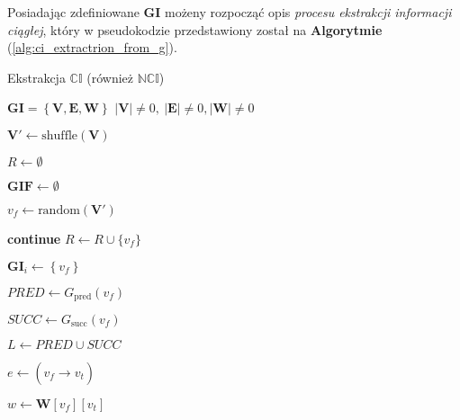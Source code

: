 Posiadając zdefiniowane $\mathbf{GI}$ możeny rozpocząć opis 
\textit{procesu ekstrakcji informacji ciągłej}, 
który w pseudokodzie przedstawiony został na \textbf{Algorytmie} (\ref{alg:ci_extractrion_from_g}).
\begin{algorithm}
    \caption{Ekstrakcja $\mathbb{CI}$ (również $\mathbb{NCI}$)}
    \label{alg:ci_extractrion_from_g}
    \begin{algorithmic}
        \Require $\mathbf{GI} = \left\{ \mathbf{V}, \mathbf{E}, \mathbf{W} \right\}$
        \Ensure $|\mathbf{V}| \neq 0, \: |\mathbf{E}| \neq 0, |\mathbf{W}| \neq 0$
        
        \State $\mathbf{V}' \gets \text{shuffle}(\mathbf{V})$
        
        \State $R \gets \emptyset$
        
        \State $\mathbf{GIF} \gets \emptyset$
        
            \State $v_f \gets \text{random}(\mathbf{V}')$
            
                \State \textbf{continue}
            \Else
                \State $R \gets R \cup \{ v_f \}$
            \EndIf

            \State $\mathbf{GI}_i \gets \left\{ v_f \right\}$

            \State $PRED \gets G_{\text{pred}}(v_{f})$
            
            \State $SUCC \gets G_{\text{succ}}(v_{f})$
            
            \State $L \gets PRED \cup SUCC$
            
                \State $e \gets (v_f \xrightarrow[]{} v_t)$
                
                \State $w \gets \mathbf{W}[v_f][v_t]$
                

\end{algorithmic}
\end{algorithm}

